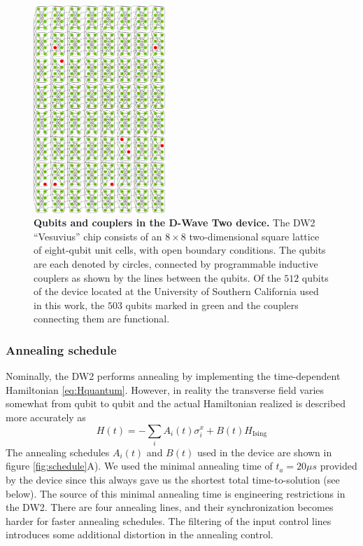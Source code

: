 %
%
\begin{figure}[h]
\centering
\includegraphics[width=0.443\textwidth]{fig08.pdf}
\caption{\textbf{Qubits and couplers in the D-Wave Two device.} The DW2 ``Vesuvius'' chip consists of an $8\times8$ two-dimensional square lattice of eight-qubit unit cells, with open boundary conditions. The qubits are each denoted by circles, connected by programmable inductive couplers as shown by the lines between the qubits. Of the $512$ qubits of the device located at the University of Southern California used in this work, the $503$ qubits marked in green and the couplers connecting them are functional.}
\label{fig:chimera}
\end{figure}
%

\subsubsection{Annealing schedule}
Nominally, the DW2 performs annealing by implementing the time-dependent Hamiltonian \eqref{eq:Hquantum}. However, in reality the transverse field varies somewhat from qubit to qubit and the actual Hamiltonian realized is described more accurately as
\begin{equation}
H(t) = -\sum_i A_i(t) \sigma_i^x +B(t) H_{\textrm{Ising}}
\label{eq:H-Ai}
\end{equation}
The annealing schedules $A_i(t)$ and $B(t)$ used in the device are shown in figure \ref{fig:schedule}A).
We used the minimal annealing time of $t_a=20\mu s$ provided by the device since this always gave us the shortest total time-to-solution (see below). The source of this minimal annealing time is engineering restrictions in the DW2. There are four annealing lines, and their synchronization becomes harder for faster annealing schedules. The filtering of the input control lines introduces some additional distortion in the annealing control.

